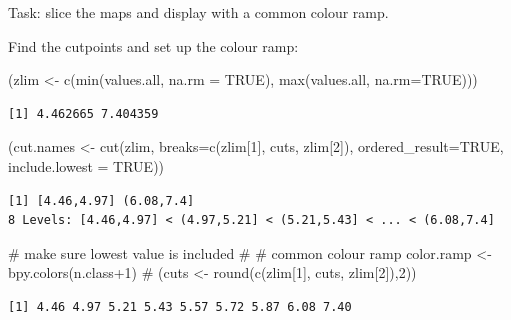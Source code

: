 \documentclass[
  letterpaper,
  DIV=11,
  numbers=noendperiod]{scrartcl}
\newenvironment{Shaded}{\begin{snugshade}}{\end{snugshade}}
\newcommand{\AttributeTok}[1]{\textcolor[rgb]{0.40,0.45,0.13}{#1}}
\newcommand{\CommentTok}[1]{\textcolor[rgb]{0.37,0.37,0.37}{#1}}
\newcommand{\ConstantTok}[1]{\textcolor[rgb]{0.56,0.35,0.01}{#1}}
\newcommand{\DecValTok}[1]{\textcolor[rgb]{0.68,0.00,0.00}{#1}}
\newcommand{\FunctionTok}[1]{\textcolor[rgb]{0.28,0.35,0.67}{#1}}
\newcommand{\NormalTok}[1]{\textcolor[rgb]{0.00,0.23,0.31}{#1}}
\newcommand{\OtherTok}[1]{\textcolor[rgb]{0.00,0.23,0.31}{#1}}
\newcommand{\SpecialCharTok}[1]{\textcolor[rgb]{0.37,0.37,0.37}{#1}}
\begin{document}
Task: slice the maps and display with a common colour ramp.

Find the cutpoints and set up the colour ramp:

\begin{Shaded}
\begin{Highlighting}[]
\NormalTok{(zlim }\OtherTok{\textless{}{-}} \FunctionTok{c}\NormalTok{(}\FunctionTok{min}\NormalTok{(values.all, }\AttributeTok{na.rm =} \ConstantTok{TRUE}\NormalTok{),}
                \FunctionTok{max}\NormalTok{(values.all, }\AttributeTok{na.rm=}\ConstantTok{TRUE}\NormalTok{)))}
\end{Highlighting}
\end{Shaded}

\begin{verbatim}
[1] 4.462665 7.404359
\end{verbatim}

\begin{Shaded}
\begin{Highlighting}[]
\NormalTok{(cut.names }\OtherTok{\textless{}{-}} \FunctionTok{cut}\NormalTok{(zlim, }\AttributeTok{breaks=}\FunctionTok{c}\NormalTok{(zlim[}\DecValTok{1}\NormalTok{], cuts, zlim[}\DecValTok{2}\NormalTok{]),}
                  \AttributeTok{ordered\_result=}\ConstantTok{TRUE}\NormalTok{, }\AttributeTok{include.lowest =} \ConstantTok{TRUE}\NormalTok{)) }
\end{Highlighting}
\end{Shaded}

\begin{verbatim}
[1] [4.46,4.97] (6.08,7.4] 
8 Levels: [4.46,4.97] < (4.97,5.21] < (5.21,5.43] < ... < (6.08,7.4]
\end{verbatim}

\begin{Shaded}
\begin{Highlighting}[]
\CommentTok{\# make sure lowest value is included}
\CommentTok{\#}
\CommentTok{\# common colour ramp}
\NormalTok{color.ramp }\OtherTok{\textless{}{-}} \FunctionTok{bpy.colors}\NormalTok{(n.class}\SpecialCharTok{+}\DecValTok{1}\NormalTok{)}
\CommentTok{\#}
\NormalTok{(cuts }\OtherTok{\textless{}{-}} \FunctionTok{round}\NormalTok{(}\FunctionTok{c}\NormalTok{(zlim[}\DecValTok{1}\NormalTok{], cuts, zlim[}\DecValTok{2}\NormalTok{]),}\DecValTok{2}\NormalTok{))}
\end{Highlighting}
\end{Shaded}

\begin{verbatim}
[1] 4.46 4.97 5.21 5.43 5.57 5.72 5.87 6.08 7.40
\end{verbatim}
\end{document}
